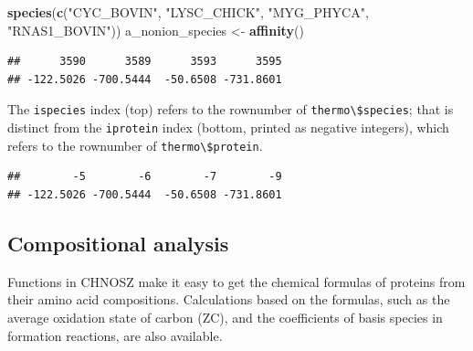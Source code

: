\documentclass[]{tufte-handout}
\newenvironment{Shaded}{}{}
\newcommand{\KeywordTok}[1]{\textcolor[rgb]{0.00,0.44,0.13}{\textbf{#1}}}
\newcommand{\StringTok}[1]{\textcolor[rgb]{0.25,0.44,0.63}{#1}}
\newcommand{\OperatorTok}[1]{\textcolor[rgb]{0.40,0.40,0.40}{#1}}
\newcommand{\NormalTok}[1]{#1}
\begin{document}
\begin{Shaded}
\begin{Highlighting}[]
\KeywordTok{species}\NormalTok{(}\KeywordTok{c}\NormalTok{(}\StringTok{"CYC_BOVIN"}\NormalTok{, }\StringTok{"LYSC_CHICK"}\NormalTok{, }\StringTok{"MYG_PHYCA"}\NormalTok{, }\StringTok{"RNAS1_BOVIN"}\NormalTok{))}
\NormalTok{a_nonion_species <-}\StringTok{ }\KeywordTok{affinity}\NormalTok{()}
\end{Highlighting}
\end{Shaded}

\begin{Shaded}
\end{Shaded}

\begin{verbatim}
##      3590      3589      3593      3595 
## -122.5026 -700.5444  -50.6508 -731.8601
\end{verbatim}

\begin{marginfigure}
The \texttt{ispecies} index (top) refers to the rownumber of
\texttt{thermo\textbackslash{}\$species}; that is distinct from the
\texttt{iprotein} index (bottom, printed as negative integers), which
refers to the rownumber of \texttt{thermo\textbackslash{}\$protein}.
\end{marginfigure}

\begin{Shaded}
\end{Shaded}

\begin{verbatim}
##        -5        -6        -7        -9 
## -122.5026 -700.5444  -50.6508 -731.8601
\end{verbatim}

\subsection{Compositional analysis}\label{compositional-analysis}

Functions in CHNOSZ make it easy to get the chemical formulas of
proteins from their amino acid compositions. Calculations based on the
formulas, such as the average oxidation state of carbon (ZC), and the
coefficients of basis species in formation reactions, are also
available.
\end{document}
